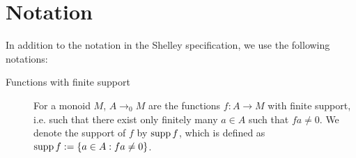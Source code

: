 \section{Notation}

In addition to the notation in the Shelley specification, we use the following notations:

\begin{description}
\item[Functions with finite support] For a monoid $M$, $A \to_0 M$
  are the functions $f : A \to M$ with finite support, i.e. such that
  there exist only finitely many $a \in A$ such that $f a \neq 0$. We
  denote the support of $f$ by $\operatorname{supp} f$, which is defined as
  $\operatorname{supp} f := \{ a \in A : f a \neq 0 \}$.
\end{description}
